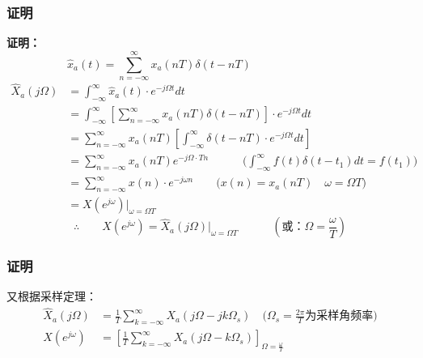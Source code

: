 \documentclass[notheorems,compress,mathserif,table]{beamer}
\begin{document}
\begin{frame}[shrink]\frametitle{证明}%
        \textbf{证明：}
        $$\hat{x}_a(t)= \sum_{n=-\infty}^{\infty}x_a(nT)\delta(t-nT)
                \quad\quad\quad\quad\quad\quad\quad\quad\quad$$
        \begin{equation*}
        \begin{split}
         \hat{X}_a(j\Omega)
             &= \int_{-\infty}^{\infty}\hat{x}_a(t)\cdot e^{-j\Omega t}dt \\
             &= \int_{-\infty}^{\infty}\left[\sum_{n=-\infty}^{\infty}x_a(nT)\delta(t-nT)\right]\cdot e^{-j\Omega t}dt \\
             &= \sum_{n=-\infty}^{\infty}x_a(nT)\left[\int_{-\infty}^{\infty}\delta(t-nT)\cdot e^{-j\Omega t}dt\right] \\
             &= \sum_{n=-\infty}^{\infty}x_a(nT) e^{-j\Omega\cdot T n} \quad\quad\quad\Big(\int_{-\infty}^{\infty}f(t)\delta(t-t_1)dt = f(t_1)\Big)\\
             &= \sum_{n=-\infty}^{\infty}x(n)\cdot e^{-j\omega n} \quad\quad \Big(x(n) =x_a(nT)\quad \omega =\Omega T \Big)\\
             &= X(e^{j\omega})\big|_{\omega = \Omega T}
        \end{split}
        \end{equation*}
        $$\therefore \quad\quad X(e^{j\omega})  = \hat{X}_a(j\Omega)\big|_{\omega = \Omega T}
                 \quad\quad\quad(\mbox{或：}\Omega=\frac{\omega}{T})$$
\end{frame}

\begin{frame}[shrink]\frametitle{证明}%
        又根据采样定理：
        \begin{equation}
        \begin{split}
        \hat{X}_a(j\Omega)  &= \frac{1}{T}\sum_{k=-\infty}^{\infty}X_a(j\Omega -j k \Omega_s) \quad\big(\Omega_s = \frac{2\pi}{T}\mbox{为采样角频率}\big)\\
        X(e^{j\omega})      &= \left[\frac{1}{T}\sum_{k=-\infty}^{\infty}X_a(j\Omega -k \Omega_s)\right]_{\Omega = \frac{\omega}{T}}
        \end{split}
        \end{equation}
\end{frame}
\end{document}
